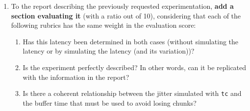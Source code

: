\begin{enumerate}
\item To the report describing the previously requested
  experimentation, \textbf{add a section evaluating it} (with a ratio out of
  10), considering that each of the following rubrics has the same
  weight in the evaluation score:
\begin{enumerate}
\item Has this latency been determined in both cases (without
  simulating the latency or by simulating the latency (and its
  variation))?
\item Is the experiment perfectly described? In other words, can it be
  replicated with the information in the report?
\item Is there a coherent relationship between the jitter simulated
  with \texttt{tc} and the buffer time that must be used to avoid
  losing chunks?
\end{enumerate}

\end{enumerate}


